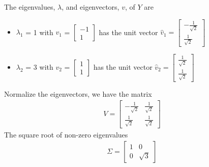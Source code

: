 \documentclass[12pt]{report}
\begin{document}
The eigenvalues, $\lambda$, and eigenvectors, $v$, of $Y$ are\\
\begin{itemize}
    \item $\lambda_1$ = 1 with $v_1$ =
    $\begin{bmatrix}
        -1 \\ 
        1 
    \end{bmatrix}$ has the unit vector $\hat{v}_1=
    \begin{bmatrix}
        -\frac{1}{\sqrt{2}} \\ 
        \frac{1}{\sqrt{2}}
    \end{bmatrix}$
    \item $\lambda_2$ = 3 with $v_2$ =
    $\begin{bmatrix}
        1 \\ 
        1
    \end{bmatrix}$ has the unit vector $\hat{v}_2=
    \begin{bmatrix}
        \frac{1}{\sqrt{2}} \\ 
        \frac{1}{\sqrt{2}}
    \end{bmatrix}$
\end{itemize}
Normalize the eigenvectors, we have the matrix 
\begin{eqnarray*}
    V=
    \begin{bmatrix}
        -\frac{1}{\sqrt{2}} & \frac{1}{\sqrt{2}} \\ 
        \frac{1}{\sqrt{2}} & \frac{1}{\sqrt{2}}
    \end{bmatrix}
\end{eqnarray*}
The square root of non-zero eigenvalues
\begin{eqnarray*}
    \Sigma =
    \begin{bmatrix}
        1 & 0\\ 
        0 & \sqrt{3}
    \end{bmatrix}
\end{eqnarray*}
\end{document}
